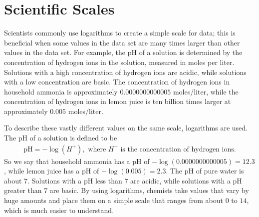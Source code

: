 \documentclass[10pt,]{book}
\theoremstyle{plain}
\theoremstyle{definition}
\theoremstyle{definition}
\theoremstyle{definition}
\numberwithin{equation}{section}
\begin{document}
\section[{Scientific Scales}]{Scientific Scales}\label{chapter05-section02}
\hypertarget{p-307}{}%
Scientists commonly use logarithms to create a simple scale for data; this is beneficial when some values in the data set are many times larger than other values in the data set. For example, the pH of a solution is determined by the concentration of hydrogen ions in the solution, measured in moles per liter. Solutions with a high concentration of hydrogen ions are acidic, while solutions with a low concentration are basic. The concentration of hydrogen ions in household ammonia is approximately \(0.0000000000005\) moles/liter, while the concentration of hydrogen ions in lemon juice is ten billion times larger at approximately \(0.005\) moles/liter.%
\par
\hypertarget{p-308}{}%
To describe these vastly different values on the same scale, logarithms are used. The pH of a solution is defined to be%
\begin{gather*}
\text{pH} = -\log \left( H^{+} \right), \text{ where } H^{+} \text{ is the concentration of hydrogen ions.}
\end{gather*}
So we say that household ammonia has a pH of \(- \log(0.0000000000005) = 12.3\), while lemon juice has a pH of \(- \log(0.005) = 2.3\). The pH of pure water is about \(7\). Solutions with a pH less than \(7\) are acidic, while solutions with a pH greater than \(7\) are basic. By using logarithms, chemists take values that vary by huge amounts and place them on a simple scale that ranges from about \(0\) to \(14\), which is much easier to understand.%
\typeout{************************************************}
\typeout{************************************************}
\end{document}
